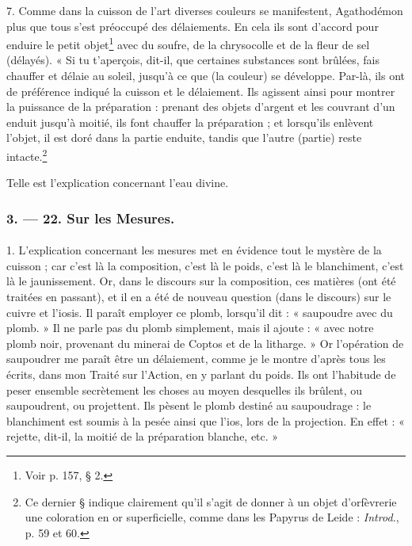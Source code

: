\documentclass[landscape, a4paper, 11pt, oneside, polutonikogreek, french]{article}
\begin{document}
7. Comme dans la cuisson de l'art diverses couleurs se manifestent, Agathodémon plus que tous s'est préoccupé des délaiements. En cela ils sont d'accord pour enduire le petit objet\footnote{Voir p. 157, § 2.} avec du soufre, de la chrysocolle et de la fleur de sel (délayés). « Si tu t'aperçois, dit-il, que certaines substances sont brûlées, fais chauffer et délaie au soleil, jusqu'à ce que (la couleur) se développe. Par-là, ils ont de préférence indiqué la cuisson et le délaiement. Ils agissent ainsi pour montrer la puissance de la préparation : prenant des objets d'argent et les couvrant d'un enduit jusqu'à moitié, ils font chauffer la préparation ; et lorsqu'ils enlèvent l'objet, il est doré dans la partie enduite, tandis que l'autre (partie) reste intacte.\footnote{Ce dernier § indique clairement qu'il s'agit de donner à un objet d'orfèvrerie une coloration en or superficielle, comme dans les Papyrus de Leide : \emph{Introd.}, p. 59 et 60.}

Telle est l'explication concernant l'eau divine.

\bigskip
\centerline{\EightStarTaper}
\centerline{\EightStarTaper\EightStarTaper}
\bigskip

\subsubsection{3. --- 22. Sur les Mesures.}
\paragraph{}
1. L'explication concernant les mesures met en évidence tout le mystère de la cuisson ; car c'est là la composition, c'est là le poids, c'est là le blanchiment, c'est là le jaunissement. Or, dans le discours sur la composition, ces matières (ont été traitées en passant), et il en a été de nouveau question (dans le discours) sur le cuivre et l'iosis. Il paraît employer ce plomb, lorsqu'il dit : « saupoudre avec du plomb. » Il ne parle pas du plomb simplement, mais il ajoute : « avec notre plomb noir, provenant du minerai de Coptos et de la litharge. » Or l'opération de saupoudrer me paraît être un délaiement, comme je le montre d'après tous les écrits, dans mon Traité sur l'Action, en y parlant du poids. Ils ont l'habitude de peser ensemble secrètement les choses au moyen desquelles ils brûlent, ou saupoudrent, ou projettent. Ils pèsent le plomb destiné au saupoudrage : le blanchiment est soumis à la pesée ainsi que l'ios, lors de la projection. En effet : « rejette, dit-il, la moitié de la préparation blanche, etc. »
\end{document}
